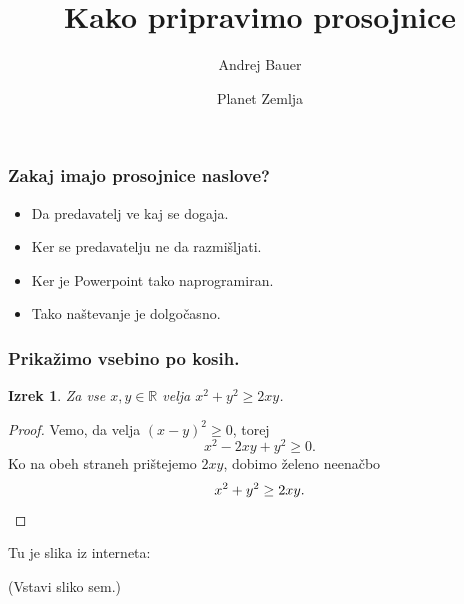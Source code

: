 \documentclass[14pt]{beamer}
\newtheorem{izrek}{Izrek}
\begin{document}
\title{Kako pripravimo prosojnice}
\author{Andrej Bauer}
\date{Planet Zemlja}

\begin{frame}
  \titlepage

\end{frame}

\begin{frame}
  \frametitle{Zakaj imajo prosojnice naslove?}

  \begin{itemize}
  \item Da predavatelj ve kaj se dogaja.
  \item Ker se predavatelju ne da razmišljati.
  \item Ker je Powerpoint tako naprogramiran.
  \item Tako naštevanje je dolgočasno.
  \end{itemize}


\end{frame}

\begin{frame}
  \frametitle{Prikažimo vsebino po kosih.}

  \begin{izrek}
    Za vse $x, y \in \mathbb{R}$ velja $x^2 + y^2 \geq 2 x y$.
  \end{izrek}

  \pause

  \begin{proof}
    Vemo, da velja $(x - y)^2 \geq 0$, torej
    \begin{equation*}
      x^2 - 2 x y + y^2 \geq 0.
    \end{equation*}
    \pause
    Ko na obeh straneh prištejemo $2 x y$, dobimo želeno neenačbo
    \begin{equation*}
      x^2 + y^2 \geq 2 x y. \qedhere
    \end{equation*}
  \end{proof}

\end{frame}

\begin{frame}
  Tu je slika iz interneta:
  \begin{center}
    (Vstavi sliko sem.)
  \end{center}


\end{frame}
\end{document}
